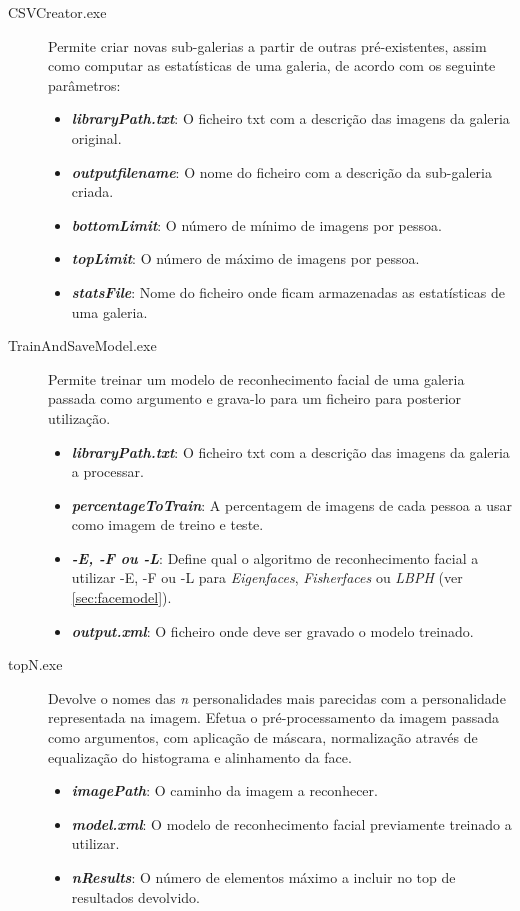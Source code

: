 \begin{description}
\item[CSVCreator.exe] Permite criar novas sub-galerias a partir de outras pré-existentes, assim como computar as estatísticas de uma galeria, de acordo com os seguinte parâmetros:

\begin{itemize}
\item \textbf{\textit{libraryPath.txt}}: O ficheiro txt com a descrição das imagens da galeria original.
\item \textbf{\textit{outputfilename}}: O nome do ficheiro com a descrição da sub-galeria criada.
\item \textbf{\textit{bottomLimit}}: O número de mínimo de imagens por pessoa.
\item \textbf{\textit{topLimit}}: O número de máximo de imagens por pessoa.
\item \textbf{\textit{statsFile}}: Nome do ficheiro onde ficam armazenadas as estatísticas de uma galeria.
\end{itemize}

\item[TrainAndSaveModel.exe] Permite treinar um modelo de reconhecimento facial de uma galeria passada como argumento e grava-lo para um ficheiro para posterior utilização.

\begin{itemize}
\item \textbf{\textit{libraryPath.txt}}: O ficheiro txt com a descrição das imagens da galeria a processar.
\item \textbf{\textit{percentageToTrain}}: A percentagem de imagens de cada pessoa a usar como imagem de treino e teste.
\item \textbf{\textit{-E, -F ou -L}}: Define qual o algoritmo de reconhecimento facial a utilizar -E, -F ou -L para \textit{Eigenfaces}, \textit{Fisherfaces} ou \textit{LBPH} (ver \ref{sec:facemodel}).
\item \textbf{\textit{output.xml}}: O ficheiro onde deve ser gravado o modelo treinado.
\end{itemize}

\item[topN.exe] Devolve o nomes das \textit{n} personalidades mais parecidas com a personalidade representada na imagem. Efetua o pré-processamento da imagem passada como argumentos, com aplicação de máscara, normalização através de equalização do histograma e alinhamento da face.

\begin{itemize}
\item \textbf{\textit{imagePath}}: O caminho da imagem a reconhecer.
\item \textbf{\textit{model.xml}}: O modelo de reconhecimento facial previamente treinado a utilizar.
\item \textbf{\textit{nResults}}: O número de elementos máximo a incluir no top de resultados devolvido.
\end{itemize}

\end{description}